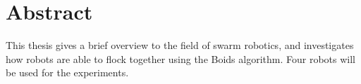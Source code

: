 \section*{Abstract}
\label{sec:abstract}

This thesis gives a brief overview to the field of swarm robotics, and investigates how robots are able to flock together using the Boids algorithm.
Four robots will be used for the experiments.

